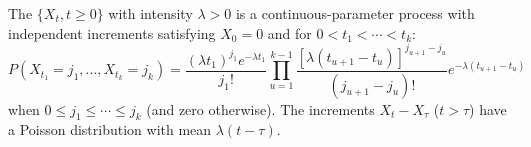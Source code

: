 The  $\{X_t, t \geq 0\}$ with intensity $\lambda > 0$ is a continuous-parameter process with independent increments satisfying $X_0 = 0$ and for $0 < t_1 < \cdots < t_k$:
$$P(X_{t_1} = j_1, \ldots, X_{t_k} = j_k) = \frac{(\lambda t_1)^{j_1} e^{-\lambda t_1}}{j_1!} \prod_{u=1}^{k-1} \frac{[\lambda(t_{u+1} - t_u)]^{j_{u+1} - j_u}}{(j_{u+1} - j_u)!} e^{-\lambda(t_{u+1} - t_u)}$$
when $0 \leq j_1 \leq \cdots \leq j_k$ (and zero otherwise). The increments $X_{t} - X_{\tau}$ ($t > \tau$) have a Poisson distribution with mean $\lambda(t - \tau)$.
